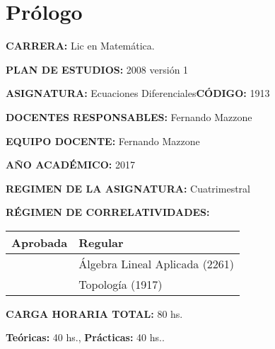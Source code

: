 
\chapter*{Prólogo}



\setlength{\unitlength}{1cm}
%
%





 \textbf{CARRERA:}  Lic en Matemática.

 \textbf{PLAN DE ESTUDIOS:} 2008 versión 1

 \textbf{ASIGNATURA:}  Ecuaciones Diferenciales\quad\textbf{CÓDIGO:} 1913

\textbf{DOCENTES RESPONSABLES:} Fernando Mazzone

\textbf{EQUIPO DOCENTE:} Fernando Mazzone

\textbf{AÑO ACADÉMICO:} 2017

\textbf{REGIMEN DE LA ASIGNATURA:} Cuatrimestral

\textbf{RÉGIMEN DE CORRELATIVIDADES:}

\begin{table}[h]
\begin{tabular}{|l|l|}\hline
 Aprobada & Regular\\\hline
 &
 Álgebra Lineal Aplicada (2261)\\\hline
 &
Topología (1917)\\ \hline
\end{tabular}
 \end{table}






\textbf{CARGA HORARIA TOTAL:}  80 hs.

\hspace{1cm}\textbf{Teóricas:} 40 hs.,      \textbf{Prácticas:}  40 hs..

